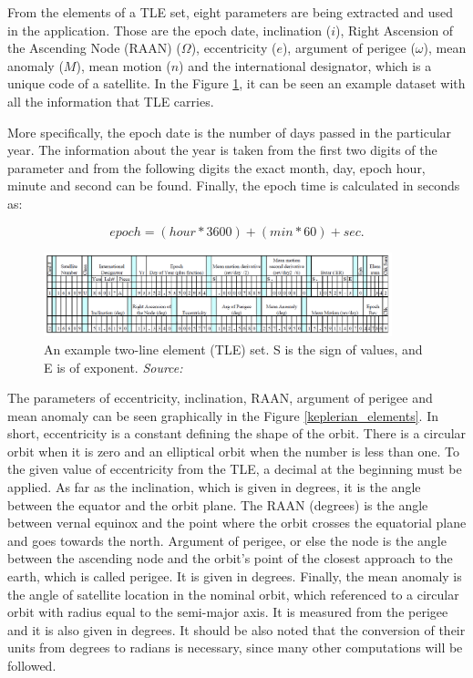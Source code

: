 From the elements of a TLE set, eight parameters are being extracted and used in the application. Those are the epoch date, inclination ($i$), Right Ascension of the Ascending Node (RAAN) ($\Omega$), eccentricity ($e$), argument of perigee ($\omega$), mean anomaly ($M$), mean motion ($n$) and the international designator, which is a unique code of a satellite. In the Figure \ref{tle}, it can be seen an example dataset with all the information that TLE carries.

More specifically, the epoch date is the number of days passed in the particular year. The information about the year is taken from the first two digits of the parameter and from the following digits the exact month, day, epoch hour, minute and second can be found. Finally, the epoch time is calculated in seconds as:

\begin{equation}
epoch = (hour * 3600) + (min * 60) + sec.
\end{equation}

\begin{figure}
\centering
\includegraphics[width=0.9\textwidth]{Images/tle.png}\caption{An example two-line element (TLE) set. S is the sign of values, and E is of exponent. \textit{Source: \cite{Vallado}}}
\label{tle} 
\end{figure}

The parameters of eccentricity, inclination, RAAN, argument of perigee and mean anomaly can be seen graphically in the Figure \ref{keplerian_elements}. In short, eccentricity is a constant defining the shape of the orbit. There is a circular orbit when it is zero and an elliptical orbit when the number is less than one. To the given value of eccentricity from the TLE, a decimal at the beginning must be applied. As far as the inclination, which is given in degrees, it is the angle between the equator and the orbit plane. The RAAN (degrees) is the angle between vernal equinox and the point where the orbit crosses the equatorial plane and goes towards the north. Argument of perigee, or else the node is the angle between the ascending node and the orbit's point of the closest approach to the earth, which is called perigee. It is given in degrees. Finally, the mean anomaly is the angle of satellite location in the nominal orbit, which referenced to a circular orbit with radius equal to the semi-major axis. It is measured from the perigee and it is also given in degrees. It should be also noted that the conversion of their units from degrees to radians is necessary, since many other computations will be followed. \cite{Vallado}

